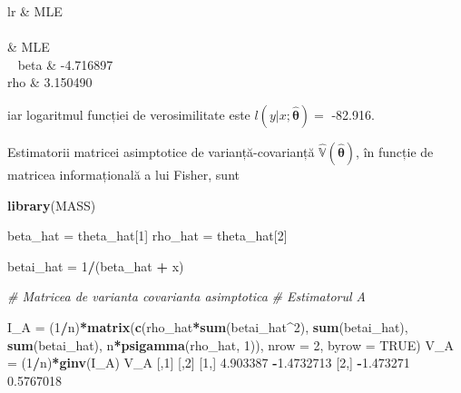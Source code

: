 \documentclass[]{article}
\newenvironment{Shaded}{\begin{snugshade}}{\end{snugshade}}
\newcommand{\KeywordTok}[1]{\textcolor[rgb]{0.13,0.29,0.53}{\textbf{#1}}}
\newcommand{\DataTypeTok}[1]{\textcolor[rgb]{0.13,0.29,0.53}{#1}}
\newcommand{\DecValTok}[1]{\textcolor[rgb]{0.00,0.00,0.81}{#1}}
\newcommand{\FloatTok}[1]{\textcolor[rgb]{0.00,0.00,0.81}{#1}}
\newcommand{\StringTok}[1]{\textcolor[rgb]{0.31,0.60,0.02}{#1}}
\newcommand{\CommentTok}[1]{\textcolor[rgb]{0.56,0.35,0.01}{\textit{#1}}}
\newcommand{\OtherTok}[1]{\textcolor[rgb]{0.56,0.35,0.01}{#1}}
\newcommand{\OperatorTok}[1]{\textcolor[rgb]{0.81,0.36,0.00}{\textbf{#1}}}
\newcommand{\NormalTok}[1]{#1}
\begin{document}

\begin{longtable}{lr}
\hiderowcolors
\toprule
  & MLE\\
\midrule
\endfirsthead
{}\\
\toprule
  & MLE\\
\midrule
\endhead
\
\endfoot
\bottomrule
\endlastfoot
\showrowcolors
beta & -4.716897\\
rho & 3.150490\\*
\end{longtable}


iar logaritmul funcției de verosimilitate este
\(l(y|x;\hat{\boldsymbol{\theta}}) =\) -82.916.

Estimatorii matricei asimptotice de varianță-covarianță
\(\hat{\mathbb{V}}(\hat{\boldsymbol{\theta}})\), în funcție de matricea
informațională a lui Fisher, sunt

\begin{Shaded}
\begin{Highlighting}[]
\KeywordTok{library}\NormalTok{(MASS)}

\NormalTok{beta_hat =}\StringTok{ }\NormalTok{theta_hat[}\DecValTok{1}\NormalTok{]}
\NormalTok{rho_hat =}\StringTok{ }\NormalTok{theta_hat[}\DecValTok{2}\NormalTok{]}

\NormalTok{betai_hat =}\StringTok{ }\DecValTok{1}\OperatorTok{/}\NormalTok{(beta_hat }\OperatorTok{+}\StringTok{ }\NormalTok{x)}

\CommentTok{# Matricea de varianta covarianta asimptotica }
\CommentTok{# Estimatorul A}

\NormalTok{I_A =}\StringTok{ }\NormalTok{(}\DecValTok{1}\OperatorTok{/}\NormalTok{n)}\OperatorTok{*}\KeywordTok{matrix}\NormalTok{(}\KeywordTok{c}\NormalTok{(rho_hat}\OperatorTok{*}\KeywordTok{sum}\NormalTok{(betai_hat}\OperatorTok{^}\DecValTok{2}\NormalTok{), }\KeywordTok{sum}\NormalTok{(betai_hat),}
                    \KeywordTok{sum}\NormalTok{(betai_hat), n}\OperatorTok{*}\KeywordTok{psigamma}\NormalTok{(rho_hat, }\DecValTok{1}\NormalTok{)), }
                  \DataTypeTok{nrow =} \DecValTok{2}\NormalTok{, }
                  \DataTypeTok{byrow =} \OtherTok{TRUE}\NormalTok{)}
\NormalTok{V_A =}\StringTok{ }\NormalTok{(}\DecValTok{1}\OperatorTok{/}\NormalTok{n)}\OperatorTok{*}\KeywordTok{ginv}\NormalTok{(I_A)}
\NormalTok{V_A}
\NormalTok{          [,}\DecValTok{1}\NormalTok{]       [,}\DecValTok{2}\NormalTok{]}
\NormalTok{[}\DecValTok{1}\NormalTok{,]  }\FloatTok{4.903387} \OperatorTok{-}\FloatTok{1.4732713}
\NormalTok{[}\DecValTok{2}\NormalTok{,] }\OperatorTok{-}\FloatTok{1.473271}  \FloatTok{0.5767018}
\end{Highlighting}
\end{Shaded}
\end{document}
